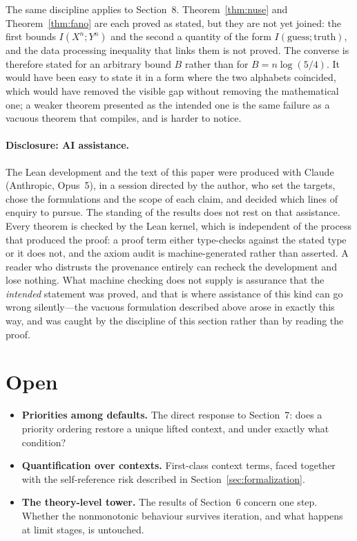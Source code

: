 \documentclass[11pt]{article}
\theoremstyle{plain}
\theoremstyle{remark}
\begin{document}
The same discipline applies to Section~8.  Theorem~\ref{thm:nuse} and
Theorem~\ref{thm:fano} are each proved as stated, but they are not yet joined:
the first bounds $I(X^{n};Y^{n})$ and the second a quantity of the form
$I(\text{guess};\text{truth})$, and the data processing inequality that links
them is not proved.  The converse is therefore stated for an arbitrary bound
$B$ rather than for $B=n\log(5/4)$.  It would have been easy to state it in a
form where the two alphabets coincided, which would have removed the visible
gap without removing the mathematical one; a weaker theorem presented as the
intended one is the same failure as a vacuous theorem that compiles, and is
harder to notice.

\paragraph{Disclosure: AI assistance.}
The Lean development and the text of this paper were produced with Claude
(Anthropic, Opus~5), in a session directed by the author, who set the targets,
chose the formulations and the scope of each claim, and decided which lines of
enquiry to pursue. The standing of the results does not rest on that assistance.
Every theorem is checked by the Lean kernel, which is independent of the process
that produced the proof: a proof term either type-checks against the stated type
or it does not, and the axiom audit is machine-generated rather than asserted. A
reader who distrusts the provenance entirely can recheck the development and
lose nothing. What machine checking does not supply is assurance that the
\emph{intended} statement was proved, and that is where assistance of this kind
can go wrong silently---the vacuous formulation described above arose in exactly
this way, and was caught by the discipline of this section rather than by
reading the proof.

\section{Open}

\begin{itemize}[leftmargin=1.2em]
  \item \textbf{Priorities among defaults.} The direct response to Section~7:
    does a priority ordering restore a unique lifted context, and under exactly
    what condition?
  \item \textbf{Quantification over contexts.} First-class context terms, faced
    together with the self-reference risk described in
    Section~\ref{sec:formalization}.
  \item \textbf{The theory-level tower.} The results of Section~6 concern one
    step. Whether the nonmonotonic behaviour survives iteration, and what
    happens at limit stages, is untouched.
\end{itemize}
\end{document}
